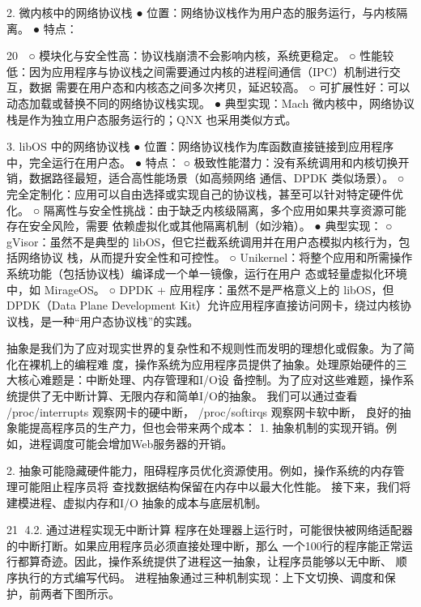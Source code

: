 2. 微内核中的网络协议栈
  ● 位置：网络协议栈作为用户态的服务运行，与内核隔离。
  ● 特点：

                                                                      20
    ○    模块化与安全性高：协议栈崩溃不会影响内核，系统更稳定。
       ○ 性能较低：因为应用程序与协议栈之间需要通过内核的进程间通信（IPC）机制进行交互，数据
         需要在用户态和内核态之间多次拷贝，延迟较高。
       ○ 可扩展性好：可以动态加载或替换不同的网络协议栈实现。
  ● 典型实现：Mach 微内核中，网络协议栈是作为独立用户态服务运行的；QNX 也采用类似方式。

3. libOS 中的网络协议栈
  ● 位置：网络协议栈作为库函数直接链接到应用程序中，完全运行在用户态。
  ● 特点：
       ○ 极致性能潜力：没有系统调用和内核切换开销，数据路径最短，适合高性能场景（如高频网络
         通信、DPDK 类似场景）。
       ○ 完全定制化：应用可以自由选择或实现自己的协议栈，甚至可以针对特定硬件优化。
       ○ 隔离性与安全性挑战：由于缺乏内核级隔离，多个应用如果共享资源可能存在安全风险，需要
         依赖虚拟化或其他隔离机制（如沙箱）。
  ● 典型实现：
       ○ gVisor：虽然不是典型的 libOS，但它拦截系统调用并在用户态模拟内核行为，包括网络协议
         栈，从而提升安全性和可控性。
       ○ Unikernel：将整个应用和所需操作系统功能（包括协议栈）编译成一个单一镜像，运行在用户
         态或轻量虚拟化环境中，如 MirageOS。
       ○ DPDK + 应用程序：虽然不是严格意义上的 libOS，但 DPDK（Data Plane Development
         Kit）允许应用程序直接访问网卡，绕过内核协议栈，是一种“用户态协议栈”的实践。

抽象是我们为了应对现实世界的复杂性和不规则性而发明的理想化或假象。为了简化在裸机上的编程难
度，操作系统为应用程序员提供了抽象。处理原始硬件的三大核心难题是：中断处理、内存管理和I/O设
备控制。为了应对这些难题，操作系统提供了无中断计算、无限内存和简单I/O的抽象。
我们可以通过查看 /proc/interrupts 观察网卡的硬中断， /proc/softirqs 观察网卡软中断，
良好的抽象能提高程序员的生产力，但也会带来两个成本：
 1. 抽象机制的实现开销。例如，进程调度可能会增加Web服务器的开销。

 2. 抽象可能隐藏硬件能力，阻碍程序员优化资源使用。例如，操作系统的内存管理可能阻止程序员将
    查找数据结构保留在内存中以最大化性能。
接下来，我们将建模进程、虚拟内存和I/O 抽象的成本与底层机制。


                                                                 21
4.2.   通过进程实现无中断计算
程序在处理器上运行时，可能很快被网络适配器的中断打断。如果应用程序员必须直接处理中断，那么
一个100行的程序能正常运行都算奇迹。因此，操作系统提供了进程这一抽象，让程序员能够以无中断、
顺序执行的方式编写代码。
进程抽象通过三种机制实现：上下文切换、调度和保护，前两者下图所示。




